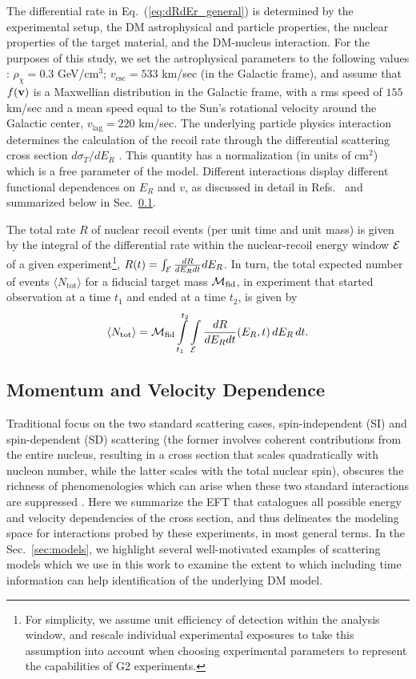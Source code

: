 \documentclass[11pt]{article}
\newcommand{\beq}{\begin{equation}} \newcommand{\eeq}{\end{equation}}
\newcommand{\Eq}[1]{Eq.~(\ref{#1})} \newcommand{\Eqs}[2]{Eqs.~(\ref{#1}) and (\ref{#2})} \newcommand{\Eqm}[2]{Eqs.~(\ref{#1}) through (\ref{#2})}
\newcommand{\Sec}[1]{Sec.~\ref{#1}} \newcommand{\Secs}[2]{Secs.~\ref{#1} and \ref{#2}} \newcommand{\Secm}[2]{Secs.~\ref{#1} through \ref{#2}}
\newcommand{\sjwColor}{red}
\newcommand{\sjw}[1]{{\color{\sjwColor} #1}}
\begin{document}
The differential rate in \Eq{eq:dRdEr_general} is determined by the experimental setup, the DM astrophysical and particle properties, the nuclear properties of the target material, and the DM-nucleus interaction. For the purposes of this study, we set the astrophysical parameters to the following values \cite{Bovy:2013raa,Piffl:2013mla}: $\rho_\chi=0.3$ GeV/cm$^3$; $v_{\mathrm{esc}} = 533$ km/sec (in the Galactic frame), and assume that $f(\mathrm{\mbox{\bf{v}}})$ is a Maxwellian distribution in the Galactic frame, with a rms speed of $155$ km/sec and a mean speed equal to the Sun's rotational velocity around the Galactic center, $v_\textrm{lag}=220$ km/sec.
The underlying particle physics interaction determines the calculation of the recoil rate through the differential scattering cross section ${d\sigma_T}/{dE_R}$ \cite{Gluscevic:2015sqa,Gresham:2014vja}. This quantity has a normalization (in units of cm${}^2$) which is a free parameter of the model. Different interactions display different functional dependences on $E_R$ and $v$, as discussed in detail in Refs.~\cite{Gluscevic:2015sqa,Gresham:2014vja} and summarized below in \Sec{subsec:momentum_velocity}.

The total rate $R$ of nuclear recoil events (per unit time and unit mass) is given by the integral of the differential rate within the nuclear-recoil energy window ${\cal E}$ of a given experiment\footnote{\sjw{For simplicity, we assume unit efficiency of detection within the analysis window, and rescale individual experimental exposures to take this assumption into account when choosing experimental parameters to represent the capabilities of G2 experiments.}}, $R(t)=\int_{\cal E} \frac{dR}{dE_R dt} dE_R$. In turn, the total expected number of events $\langle N_\mathrm{tot}\rangle$ for a fiducial target mass ${\cal M}_\textrm{fid}$, in experiment that started observation at a time $t_1$ and ended at a time $t_2$, is given by
\beq \label{eq:totevents}
\langle N_\mathrm{tot}\rangle =  \cM_\textrm{fid} \int\limits_{t_1}^{t_2} \int\limits_\cE  \frac{dR}{dE_R dt}(E_R,t)\,dE_R \,dt.
\eeq


\subsection{Momentum and Velocity Dependence}
\label{subsec:momentum_velocity}

Traditional focus on the two standard scattering cases, spin-independent (SI) and spin-dependent (SD) scattering (the former involves coherent contributions from the entire nucleus, resulting in a cross section that scales quadratically with nucleon number, while the latter scales with the total nuclear spin), obscures the richness of phenomenologies which can arise when these two standard interactions are suppressed \cite{Fitzpatrick:2012ix,Gresham:2014vja}. Here we summarize the EFT that catalogues all possible energy and velocity dependencies of the cross section, and thus delineates the modeling space for interactions probed by these experiments, in most general terms. In the \Sec{sec:models}, we highlight several well-motivated examples of scattering models which we use in this work to examine the extent to which including time information can help identification of the underlying DM model.
\end{document}
